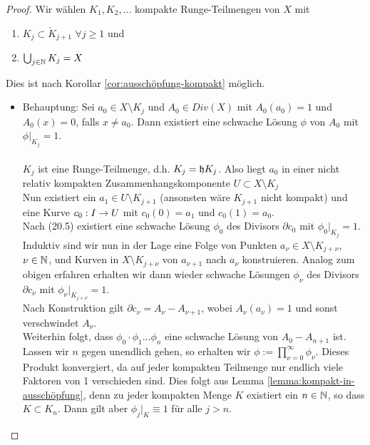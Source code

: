 \begin{proof}
  Wir wählen $K_1, K_2, \dots$ kompakte Runge-Teilmengen von $X$ mit
  \begin{enumerate}
  \item $K_j \subset \mathring{K}_{j+1}$ $\forall j \geq 1$ und
  \item $\bigcup_{j \in \mathbb{N}} K_j = X$
  \end{enumerate}
  Dies ist nach Korollar \ref{cor:ausschöpfung-kompakt} möglich.
  \begin{itemize}
  \item Behauptung: Sei $a_0 \in X \setminus K_j$ und $A_0 \in Div(X)$
    mit $A_0(a_0) = 1$ und $A_0(x) = 0$, falls $x \neq a_0$. Dann
    existiert eine schwache Lösung $\phi$ von $A_0$ mit $\phi |_{K_j}
    = 1$. \\
    \\
    $K_j$ ist eine Runge-Teilmenge, d.h. $K_j = \mathfrak{h}{K_j}$. Also
    liegt $a_0$ in einer nicht relativ kompakten
    Zusammenhangskomponente $U \subset X \setminus K_j$ \\
    Nun existiert ein $a_1 \in U \setminus K_{j+1}$ (ansonsten wäre
    $K_{j+1}$ nicht kompakt) und eine Kurve $c_0: I \rightarrow U$ mit $c_0(0)
  =a_1$ und $c_0(1) = a_0$. \\
  Nach (20.5) existiert eine schwache Lösung $\phi_0$ des Divisors
  $\partial c_0$ mit $\phi_0|_{K_j} = 1$. \\
  Induktiv sind wir nun in der Lage eine Folge von Punkten $a_\nu \in
  X \setminus K_{j+ \nu}$, $\nu \in \mathbb{N}$, und Kurven in $X \setminus
  K_{j+\nu}$ von $a_{\nu+1}$ nach $a_\nu$ konstruieren. Analog zum
  obigen erfahren erhalten wir dann wieder schwache Lösungen
  $\phi_\nu$ des Divisors $\partial c_\nu$ mit $\phi_\nu |_{K_{j+\nu}}
  = 1$. \\
  Nach Konstruktion gilt $\partial c_\nu = A_\nu - A_{\nu+1}$, wobei
  $A_\nu(a_\nu) = 1$ und sonst verschwindet $A_\nu$. \\
  Weiterhin folgt, dass $\phi_0 \cdot \phi_1 \dots \phi_n$ eine
  schwache Lösung von $A_0 - A_{n+1}$ ist.
  Lassen wir $n$ gegen unendlich gehen, so erhalten wir $\phi :=
  \prod_{\nu = 0}^\infty \phi_\nu$. Dieses Produkt konvergiert, da
  auf jeder kompakten Teilmenge nur endlich viele Faktoren von 1
  verschieden sind. Dies folgt aus Lemma
  \ref{lemma:kompakt-in-ausschöpfung}, denn zu jeder kompakten Menge
  $K$ existiert ein $n \in \mathbb{N}$, so dass $K \subset K_n$. Dann gilt
  aber $\phi_j |_K \equiv 1$ für alle $j > n$.

\end{itemize}
\end{proof}
